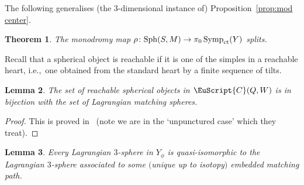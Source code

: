 \documentclass[10pt,a4paper]{amsart}
\newcommand{\scrC}{\EuScript{C}}
\DeclareMathOperator{\Symp}{Symp}
\newtheorem{thm}{Theorem}[section]
\newtheorem{lem}[thm]{Lemma}
\theoremstyle{definition}
\numberwithin{equation}{section}
\begin{document}
The following generalises (the 3-dimensional instance of) Proposition~\ref{prop:mod center}.


\begin{thm} \label{thm:bordered surface case}
The monodromy map $\rho\colon \mathrm{Sph}(S,M) \to \pi_0\Symp_{\rm ct}(Y)$ splits.
\end{thm}


Recall that a spherical object is reachable if it is one of the simples in a reachable heart, i.e.,~one obtained from the standard heart by a finite sequence of tilts.

\begin{lem}
The set of reachable spherical objects in $\scrC(Q,W)$ is in bijection with the set of Lagrangian matching spheres.
\end{lem}

\begin{proof} This is proved in~\cite{King-QiuYu} (note we are in the `unpunctured case' which they treat). \end{proof}

\begin{lem} \label{lem:quis to matching}
Every Lagrangian $3$-sphere in $Y_{\phi}$ is quasi-isomorphic to the Lagrangian $3$-sphere associated to some $($unique up to isotopy$)$ embedded matching path.
\end{lem}
\end{document}
